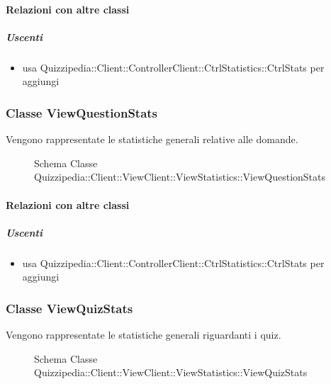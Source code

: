 \paragraph{Relazioni con altre classi}
\subparagraph{Uscenti}
\begin{itemize}
\item usa Quizzipedia::Client::ControllerClient::CtrlStatistics::CtrlStats per aggiungi
\end{itemize}
\subsubsection{Classe ViewQuestionStats}
Vengono rappresentate le statistiche generali relative alle domande.
\begin{figure}[H]
\centering
\noindent{}
\caption[Schema Classe ViewQuestionStats]{Schema Classe Quizzipedia::Client::ViewClient::ViewStatistics::ViewQuestionStats}
\end{figure}
\paragraph{Relazioni con altre classi}
\subparagraph{Uscenti}
\begin{itemize}
\item usa Quizzipedia::Client::ControllerClient::CtrlStatistics::CtrlStats per aggiungi
\end{itemize}
\subsubsection{Classe ViewQuizStats}
Vengono rappresentate le statistiche generali riguardanti i quiz.
\begin{figure}[H]
\centering
\noindent{}
\caption[Schema Classe ViewQuizStats]{Schema Classe Quizzipedia::Client::ViewClient::ViewStatistics::ViewQuizStats}
\end{figure}
